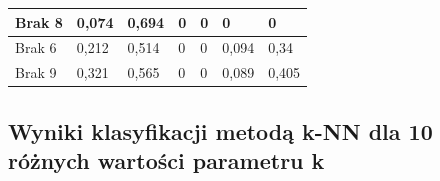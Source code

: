 \documentclass{classrep}
\begin{document}
{\begin{table}[H]
\begin{center}
\begin{tabular}{|l|l|l|l|l|l|l|}
Brak 8                                                                  & 0,074                                                        & 0,694                                                           & 0                                                                & 0                                                                   & 0                                                               & 0                                                                  \\ \hline
Brak 6                                                                  & 0,212                                                        & 0,514                                                           & 0                                                                & 0                                                                   & 0,094                                                           & 0,34                                                               \\ \hline
Brak 9                                                                  & 0,321                                                        & 0,565                                                           & 0                                                                & 0                                                                   & 0,089                                                           & 0,405                                                              \\ \hline
\end{tabular}
\end{center}
\end{table}



\subsection{Wyniki klasyfikacji metodą k-NN dla 10 różnych wartości parametru k}

}
\end{document}
